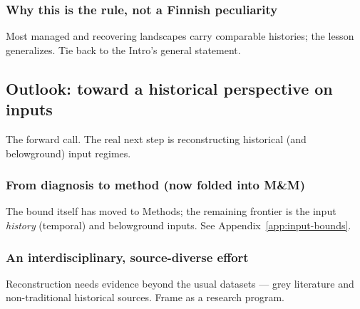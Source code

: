 \documentclass[11pt]{article}
\begin{document}
\subsubsection{Why this is the rule, not a Finnish peculiarity}
Most managed and recovering landscapes carry comparable histories; the lesson
generalizes. Tie back to the Intro's general statement.

\subsection{Outlook: toward a historical perspective on inputs}
The forward call. The real next step is reconstructing historical (and
belowground) input regimes.

\subsubsection{From diagnosis to method (now folded into M\&M)}
The bound itself has moved to Methods; the remaining frontier is the input
\emph{history} (temporal) and belowground inputs. See Appendix~\ref{app:input-bounds}.

\subsubsection{An interdisciplinary, source-diverse effort}
Reconstruction needs evidence beyond the usual datasets --- grey literature
and non-traditional historical sources. Frame as a research program.
\end{document}
